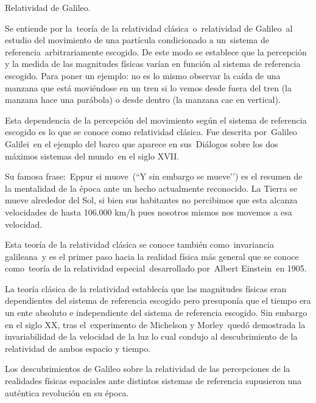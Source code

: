 \newpage %
\begin{myblock}{Relatividad de Galileo.}
\begin{small}
\vspace{2mm} Se entiende por la teoría de la relatividad clásica o relatividad de Galileo al estudio del movimiento de una partícula condicionado a un sistema de referencia arbitrariamente escogido. De este modo se establece que la percepción y la medida de las magnitudes físicas varían en función al sistema de referencia escogido. Para poner un ejemplo: no es lo mismo observar la caída de una manzana que está moviéndose en un tren si lo vemos desde fuera del tren (la manzana hace una parábola) o desde dentro (la manzana cae en vertical).

\vspace{2mm} Esta dependencia de la percepción del movimiento según el sistema de referencia escogido es lo que se conoce como relatividad clásica. Fue descrita por Galileo Galilei en el ejemplo del barco que aparece en sus Diálogos sobre los dos máximos sistemas del mundo en el siglo XVII.

\vspace{2mm} Su famosa frase: Eppur si muove (``Y sin embargo se mueve’’) es el resumen de la mentalidad de la época ante un hecho actualmente reconocido. La Tierra se mueve alrededor del Sol, si bien sus habitantes no percibimos que esta alcanza velocidades de hasta 106.000 km/h pues nosotros mismos nos movemos a esa velocidad. 

\vspace{2mm} Esta teoría de la relatividad clásica se conoce también como invariancia galileana y es el primer paso hacia la realidad física más general que se conoce como teoría de la relatividad especial desarrollado por Albert Einstein en 1905.

\vspace{2mm} La teoría clásica de la relatividad establecía que las magnitudes físicas eran dependientes del sistema de referencia escogido pero presuponía que el tiempo era un ente absoluto e independiente del sistema de referencia escogido. Sin embargo en el siglo XX, tras el experimento de Michelson y Morley quedó demostrada la invariabilidad de la velocidad de la luz lo cual condujo al descubrimiento de la relatividad de ambos espacio y tiempo.

\vspace{2mm} Los descubrimientos de Galileo sobre la relatividad de las percepciones de la realidades físicas espaciales ante distintos sistemas de referencia supusieron una auténtica revolución en su época.	
\end{small}
\end{myblock}
